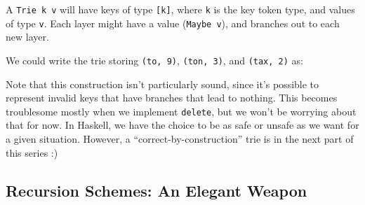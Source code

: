 \documentclass[]{article}
\newenvironment{Shaded}{}{}
\newcommand{\CharTok}[1]{\textcolor[rgb]{0.25,0.44,0.63}{#1}}
\newcommand{\CommentTok}[1]{\textcolor[rgb]{0.38,0.63,0.69}{\textit{#1}}}
\newcommand{\DataTypeTok}[1]{\textcolor[rgb]{0.56,0.13,0.00}{#1}}
\newcommand{\DecValTok}[1]{\textcolor[rgb]{0.25,0.63,0.44}{#1}}
\newcommand{\FunctionTok}[1]{\textcolor[rgb]{0.02,0.16,0.49}{#1}}
\newcommand{\NormalTok}[1]{#1}
\newcommand{\OtherTok}[1]{\textcolor[rgb]{0.00,0.44,0.13}{#1}}
\begin{document}
A \texttt{Trie\ k\ v} will have keys of type \texttt{{[}k{]}}, where \texttt{k}
is the key token type, and values of type \texttt{v}. Each layer might have a
value (\texttt{Maybe\ v}), and branches out to each new layer.

We could write the trie storing \texttt{(to,\ 9)}, \texttt{(ton,\ 3)}, and
\texttt{(tax,\ 2)} as:

\begin{Shaded}
\end{Shaded}

Note that this construction isn't particularly sound, since it's possible to
represent invalid keys that have branches that lead to nothing. This becomes
troublesome mostly when we implement \texttt{delete}, but we won't be worrying
about that for now. In Haskell, we have the choice to be as safe or unsafe as we
want for a given situation. However, a ``correct-by-construction'' trie is in
the next part of this series :)

\hypertarget{recursion-schemes-an-elegant-weapon}{%
\subsection{Recursion Schemes: An Elegant
Weapon}\label{recursion-schemes-an-elegant-weapon}}
\end{document}
